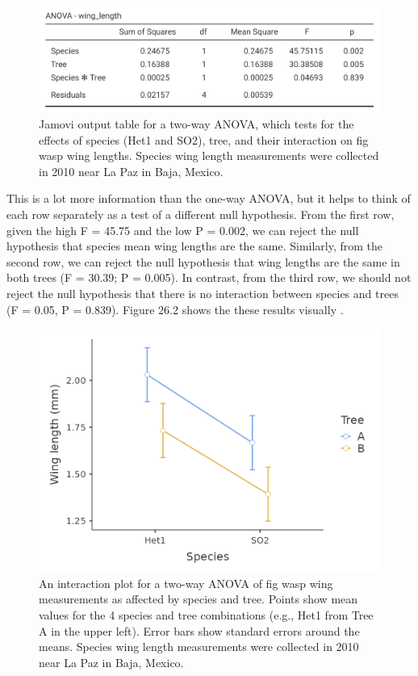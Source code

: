 \documentclass[
]{scrbook}
\begin{document}
\begin{figure}
\includegraphics[width=1\linewidth]{img/jamovi_two-way_ANOVA_no_interaction} \caption{Jamovi output table for a two-way ANOVA, which tests for the effects of species (Het1 and SO2), tree, and their interaction on fig wasp wing lengths. Species wing length measurements were collected in 2010 near La Paz in Baja, Mexico.}\label{fig:unnamed-chunk-120}
\end{figure}

This is a lot more information than the one-way ANOVA, but it helps to think of each row separately as a test of a different null hypothesis.
From the first row, given the high F = 45.75 and the low P = 0.002, we can reject the null hypothesis that species mean wing lengths are the same.
Similarly, from the second row, we can reject the null hypothesis that wing lengths are the same in both trees (F = 30.39; P = 0.005).
In contrast, from the third row, we should not reject the null hypothesis that there is no interaction between species and trees (F = 0.05, P = 0.839).
Figure 26.2 shows the these results visually \citep{Jamovi2022}.

\begin{figure}
\includegraphics[width=1\linewidth]{img/two-way_ANOVA_no_interaction} \caption{An interaction plot for a two-way ANOVA of fig wasp wing measurements as affected by species and tree. Points show mean values for the 4 species and tree combinations (e.g., Het1 from Tree A in the upper left). Error bars show standard errors around the means. Species wing length measurements were collected in 2010 near La Paz in Baja, Mexico.}\label{fig:unnamed-chunk-121}
\end{figure}
\end{document}
